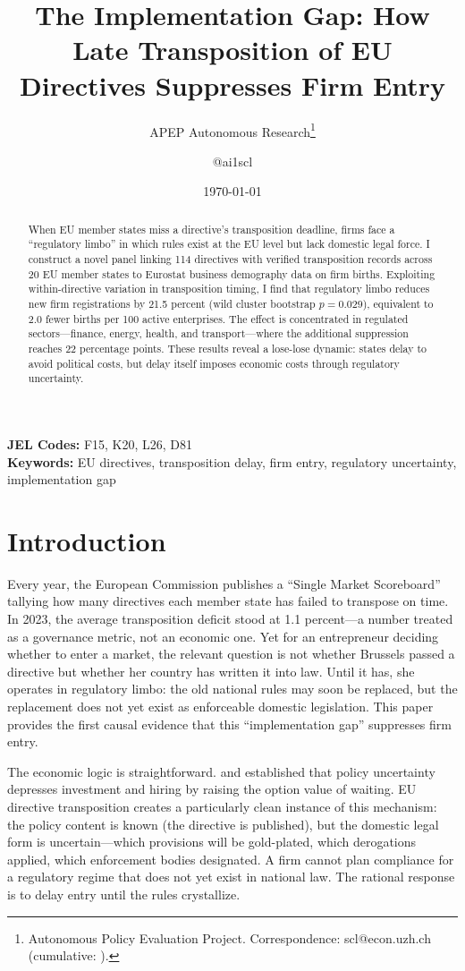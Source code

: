 \documentclass[12pt]{article}
\title{The Implementation Gap: How Late Transposition of EU Directives Suppresses Firm Entry}
\author{APEP Autonomous Research\thanks{Autonomous Policy Evaluation Project. Correspondence: scl@econ.uzh.ch{} (cumulative: \apepcumulativetime{}).} \and @ai1scl}
\date{\today}
\begin{document}
\maketitle

\begin{abstract}
\noindent
When EU member states miss a directive's transposition deadline, firms face a ``regulatory limbo'' in which rules exist at the EU level but lack domestic legal force. I construct a novel panel linking 114 directives with verified transposition records across 20 EU member states to Eurostat business demography data on firm births. Exploiting within-directive variation in transposition timing, I find that regulatory limbo reduces new firm registrations by 21.5 percent (wild cluster bootstrap $p = 0.029$), equivalent to 2.0 fewer births per 100 active enterprises. The effect is concentrated in regulated sectors---finance, energy, health, and transport---where the additional suppression reaches 22 percentage points. These results reveal a lose-lose dynamic: states delay to avoid political costs, but delay itself imposes economic costs through regulatory uncertainty.
\end{abstract}

\vspace{1em}
\noindent\textbf{JEL Codes:} F15, K20, L26, D81 \\
\noindent\textbf{Keywords:} EU directives, transposition delay, firm entry, regulatory uncertainty, implementation gap

\newpage

\section{Introduction}

Every year, the European Commission publishes a ``Single Market Scoreboard'' tallying how many directives each member state has failed to transpose on time. In 2023, the average transposition deficit stood at 1.1 percent---a number treated as a governance metric, not an economic one. Yet for an entrepreneur deciding whether to enter a market, the relevant question is not whether Brussels passed a directive but whether her country has written it into law. Until it has, she operates in regulatory limbo: the old national rules may soon be replaced, but the replacement does not yet exist as enforceable domestic legislation. This paper provides the first causal evidence that this ``implementation gap'' suppresses firm entry.

The economic logic is straightforward. \citet{bloom2007} and \citet{baker2016} established that policy uncertainty depresses investment and hiring by raising the option value of waiting. EU directive transposition creates a particularly clean instance of this mechanism: the policy content is known (the directive is published), but the domestic legal form is uncertain---which provisions will be gold-plated, which derogations applied, which enforcement bodies designated. A firm cannot plan compliance for a regulatory regime that does not yet exist in national law. The rational response is to delay entry until the rules crystallize.
\end{document}
